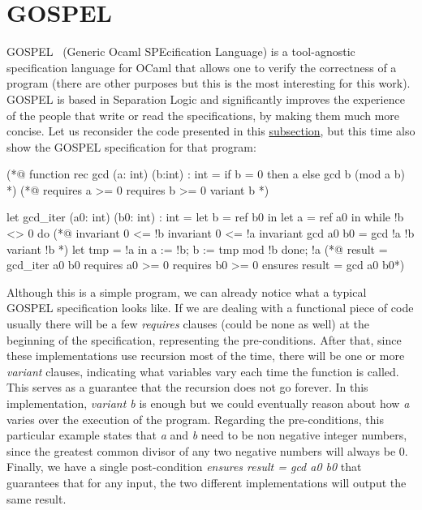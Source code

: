 \FloatBarrier
\section{GOSPEL}
\label{sec:gospel}

GOSPEL~\cite{DBLP:conf/fm/ChargueraudFLP19} (Generic Ocaml SPEcification Language) is a tool-agnostic specification language for OCaml that allows one to verify the correctness of a program (there are other purposes but this is the most interesting for this work).
GOSPEL is based in Separation Logic and significantly improves the experience of the people that write or read the specifications, by making them much more concise.
Let us reconsider the code presented in this \hyperref[sub:examples_ocaml]{subsection}, but this time also show the GOSPEL specification for that program:

\begin{gospel}
  (*@ function rec gcd (a: int) (b:int) : int =
      if b = 0 then a
      else gcd b (mod a b) *)
  (*@ requires a >= 0
      requires b >= 0
      variant b *)
\end{gospel}

\begin{gospel}
  let gcd_iter (a0: int) (b0: int) : int =
    let b = ref b0 in
    let a = ref a0 in
    while !b <> 0 do
        (*@ invariant 0 <= !b
            invariant 0 <= !a
            invariant gcd a0 b0 = gcd !a !b
            variant !b *)
        let tmp = !a in
        a := !b;
        b := tmp mod !b
    done;
    !a
  (*@ result = gcd_iter a0 b0
      requires a0 >= 0
      requires b0 >= 0
      ensures result = gcd a0 b0*)
\end{gospel}

Although this is a simple program, we can already notice what a typical GOSPEL specification looks like.
If we are dealing with a functional piece of code usually there will be a few \emph{requires} clauses (could be none as well) at the beginning of the specification, representing the pre-conditions.
After that, since these implementations use recursion most of the time, there will be one or more \emph{variant} clauses, indicating what variables vary each time the function is called.
This serves as a guarantee that the recursion does not go forever.
In this implementation, \emph{variant b} is enough but we could eventually reason about how \emph{a} varies over the execution of the program. 
Regarding the pre-conditions, this particular example states that \emph{a} and \emph{b} need to be non negative integer numbers, since the greatest common divisor of any two negative numbers will always be 0.
Finally, we have a single post-condition \emph{ensures result = gcd a0 b0} that guarantees that for any input, the two different implementations will output the same result. 


